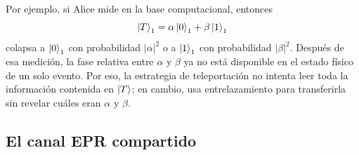 \documentclass[12pt,a4paper]{article}
\theoremstyle{definition}
\theoremstyle{plain}
\theoremstyle{remark}
\begin{document}
Por ejemplo, si Alice mide en la base computacional, entonces
\begin{equation*}
    \ket{T}_1=\alpha\ket{0}_1+\beta\ket{1}_1
\end{equation*}
colapsa a $\ket{0}_1$ con probabilidad $|\alpha|^2$ o a $\ket{1}_1$ con probabilidad $|\beta|^2$. Después de esa medición, la fase relativa entre $\alpha$ y $\beta$ ya no está disponible en el estado físico de un solo evento. Por eso, la estrategia de teleportación no intenta leer toda la información contenida en $\ket{T}$; en cambio, usa entrelazamiento para transferirla sin revelar cuáles eran $\alpha$ y $\beta$.

\subsection{El canal EPR compartido}
\end{document}
